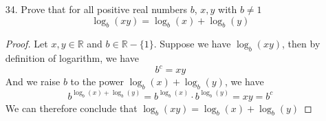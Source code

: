 \documentclass[12pt]{article}
\newcommand{\R}{\mathbb{R}}
\begin{document}
\begin{enumerate}
\begin{enumerate}
\begin{enumerate}[a.]
                    \item Is \( H \) onto? Prove or give a counterexample.
                        \begin{proof}
                             To prove that \( H \) is onto, we need to show that for every $(u, v) \in \mathbb{R} \times \mathbb{R}$, there exists $(x, y) \in \mathbb{R} \times \mathbb{R}$ such that $H(x, y) = (u, v)$.

                            Let $(u, v) \in \mathbb{R} \times \mathbb{R}$. We need to find $(x, y) \in \mathbb{R} \times \mathbb{R}$ such that:
                            \[
                            H(x, y) = (u, v).
                            \]
                    
                            By the definition of \( H \), this means:
                            \[
                            (x + 1, 2 - y) = (u, v).
                            \]
                    
                            This gives us the system of equations:
                            \[
                            x + 1 = u \quad \text{and} \quad 2 - y = v.
                            \]
                    
                            Solving these equations, we find:
                            \[
                            x = u - 1 \quad \text{and} \quad y = 2 - v.
                            \]
                    
                            Therefore, for the given $(u, v) \in \mathbb{R} \times \mathbb{R}$, the point $(x, y) = (u - 1, 2 - v) \in \mathbb{R} \times \mathbb{R}$ satisfies $H(x, y) = (u, v)$.
                    
                            Thus, \( H \) is onto.
                        \end{proof}
                \end{enumerate}
            \item[34.] Prove that for all positive real numbers $b$, $x,y$ with $b\neq 1$
                \[
                \log_b(xy) = \log_b(x)+\log_b(y)
                \]
                \begin{proof}
                    Let $x,y \in \R$ and $b \in \R - \{1\}$. Suppose we have $\log_b(xy)$, then by definition of logarithm, we have
                    \[
                    b^c = xy
                    \]
                    And we raise $b$ to the power $\log_b(x)+\log_b(y)$, we have
                    \[
                    b^{\log_b(x)+\log_b(y)} = b^{\log_b(x)}\cdot b^{\log_b(y)} = xy = b^c
                    \]
                    We can therefore conclude that $\log_b(xy) = \log_b(x)+\log_b(y)$
                    

\end{proof}
\end{enumerate}
\end{enumerate}
\end{document}
